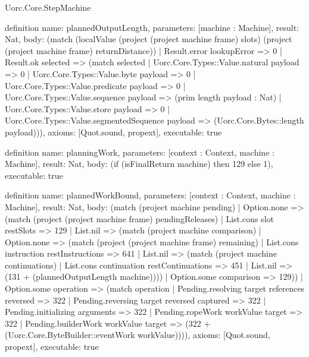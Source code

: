 \begin{lexlean}{Uorc.Core.StepMachine}
\begin{semanticmodule}
definition{
  name: plannedOutputLength,
  parameters: [machine : Machine],
  result: Nat,
  body: (match (localValue (project (project machine frame) slots) (project (project machine frame) returnDistance))
    | Result.error lookupError => 0
    | Result.ok selected => (match selected
      | Uorc.Core.Types::Value.natural payload => 0
      | Uorc.Core.Types::Value.byte payload => 0
      | Uorc.Core.Types::Value.predicate payload => 0
      | Uorc.Core.Types::Value.sequence payload => (prim length payload : Nat)
      | Uorc.Core.Types::Value.store payload => 0
      | Uorc.Core.Types::Value.segmentedSequence payload => (Uorc.Core.Bytes::length payload))),
  axioms: [Quot.sound, propext],
  executable: true
}

definition{
  name: planningWork,
  parameters: [context : Context, machine : Machine],
  result: Nat,
  body: (if (isFinalReturn machine) then 129 else 1),
  executable: true
}

definition{
  name: plannedWorkBound,
  parameters: [context : Context, machine : Machine],
  result: Nat,
  body: (match (project machine pending)
    | Option.none => (match (project (project machine frame) pendingReleases)
      | List.cons slot restSlots => 129
      | List.nil => (match (project machine comparison)
        | Option.none => (match (project (project machine frame) remaining)
          | List.cons instruction restInstructions => 641
          | List.nil => (match (project machine continuations)
            | List.cons continuation restContinuations => 451
            | List.nil => (131 + (plannedOutputLength machine))))
        | Option.some comparison => 129))
    | Option.some operation => (match operation
      | Pending.resolving target references reversed => 322
      | Pending.reversing target reversed captured => 322
      | Pending.initializing arguments => 322
      | Pending.ropeWork workValue target => 322
      | Pending.builderWork workValue target => (322 + (Uorc.Core.ByteBuilder::eventWork workValue)))),
  axioms: [Quot.sound, propext],
  executable: true
}
\end{semanticmodule}
\end{lexlean}
